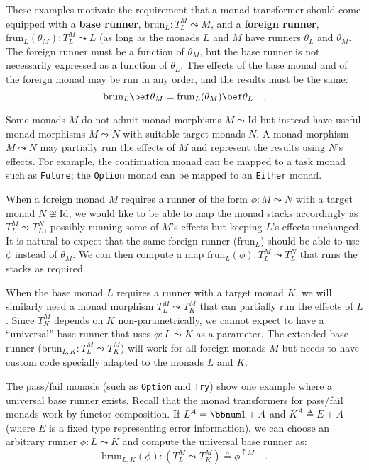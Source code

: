 These examples motivate the requirement that a monad transformer should
come equipped with
a\textbf{ base runner}, $\text{brun}_{L}:T_{L}^{M}\leadsto M$, and
a \textbf{foreign runner}, $\text{frun}_{L}(\theta_{M}):T_{L}^{M}\leadsto L$
(as long as the monads $L$ and $M$ have runners $\theta_{L}$ and
$\theta_{M}$. The foreign runner must be a function of $\theta_{M}$,
but the base runner is not necessarily expressed as a function of
$\theta_{L}$. The effects of the base monad and of the foreign monad
may be run in any order, and the results must be the same:
\[
\text{brun}_{L}\bef\theta_{M}=\text{frun}_{L}(\theta_{M})\bef\theta_{L}\quad.
\]

Some monads $M$ do not admit monad morphisms $M\leadsto\text{Id}$
but instead have useful monad morphisms $M\leadsto N$ with suitable
target monads $N$. A monad morphism $M\leadsto N$ may partially
run the effects of $M$ and represent the results using $N$\textsf{'}s effects.
For example, the continuation monad can be mapped to a task monad
such as \lstinline!Future!; the \lstinline!Option! monad can be
mapped to an \lstinline!Either! monad.

When a foreign monad $M$ requires a runner of the form $\phi:M\leadsto N$
with a target monad $N\not\cong\text{Id}$, we would like to be able
to map the monad stacks accordingly as $T_{L}^{M}\leadsto T_{L}^{N}$,
possibly running some of $M$\textsf{'}s effects but keeping $L$\textsf{'}s effects
unchanged. It is natural to expect that the same foreign runner ($\text{frun}_{L}$)
should be able to use $\phi$ instead of $\theta_{M}$. We can then
compute a map $\text{frun}_{L}\left(\phi\right):T_{L}^{M}\leadsto T_{L}^{N}$
that runs the stacks as required.

When the base monad $L$ requires a runner with a target monad $K$,
we will similarly need a monad morphism $T_{L}^{M}\leadsto T_{K}^{M}$
that can partially run the effects of $L$. Since $T_{K}^{M}$ depends
on $K$ non-parametrically, we cannot expect to have a \textsf{``}universal\textsf{''}
base runner that uses $\phi:L\leadsto K$ as a parameter. The extended
base runner ($\text{brun}_{L,K}:T_{L}^{M}\leadsto T_{K}^{M}$) will
work for all foreign monads $M$ but needs to have custom code specially
adapted to the monads $L$ and $K$.

The pass/fail monads (such as \lstinline!Option! and \lstinline!Try!)
show one example where a universal base runner
exists. Recall that the monad transformers for pass/fail monads work
by functor composition. If $L^{A}=\bbnum 1+A$ and $K^{A}\triangleq E+A$
(where $E$ is a fixed type representing error information), we can
choose an arbitrary runner $\phi:L\leadsto K$ and compute the universal
base runner as:
\[
\text{brun}_{L,K}(\phi):(T_{L}^{M}\leadsto T_{K}^{M})\triangleq\phi^{\uparrow M}\quad.
\]

